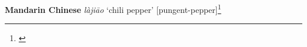 \begin{etymology}\label{ety:lajiao}
\textbf{Mandarin Chinese}  \textit{làjiāo} `chili pepper' [pungent-pepper]\footnote{\textcite{defrancis_abc_2003}}
\end{etymology}